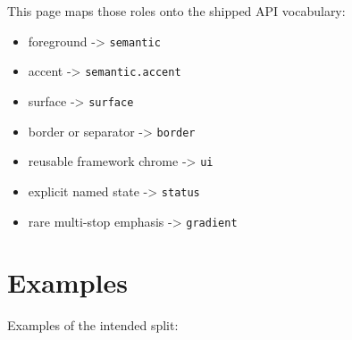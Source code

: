 This page maps those roles onto the shipped API vocabulary:

\begin{itemize}
\tightlist
\item
  foreground -\textgreater{} \texttt{s\allowbreak{}e\allowbreak{}m\allowbreak{}a\allowbreak{}n\allowbreak{}t\allowbreak{}i\allowbreak{}c}
\item
  accent -\textgreater{} \texttt{s\allowbreak{}e\allowbreak{}m\allowbreak{}a\allowbreak{}n\allowbreak{}t\allowbreak{}i\allowbreak{}c\allowbreak{}.\allowbreak{}a\allowbreak{}c\allowbreak{}c\allowbreak{}e\allowbreak{}n\allowbreak{}t}
\item
  surface -\textgreater{} \texttt{s\allowbreak{}u\allowbreak{}r\allowbreak{}f\allowbreak{}a\allowbreak{}c\allowbreak{}e}
\item
  border or separator -\textgreater{} \texttt{b\allowbreak{}o\allowbreak{}r\allowbreak{}d\allowbreak{}e\allowbreak{}r}
\item
  reusable framework chrome -\textgreater{} \texttt{u\allowbreak{}i}
\item
  explicit named state -\textgreater{} \texttt{s\allowbreak{}t\allowbreak{}a\allowbreak{}t\allowbreak{}u\allowbreak{}s}
\item
  rare multi-stop emphasis -\textgreater{} \texttt{g\allowbreak{}r\allowbreak{}a\allowbreak{}d\allowbreak{}i\allowbreak{}e\allowbreak{}n\allowbreak{}t}
\end{itemize}

\section{Examples}\label{record-028-examples}

Examples of the intended split:

